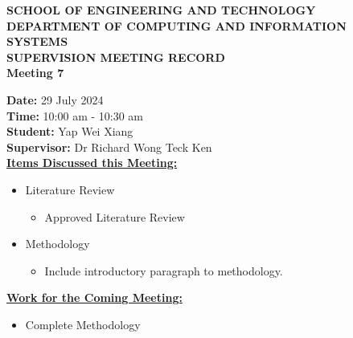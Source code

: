 \documentclass[a4paper, 12pt]{report}
\begin{document}
	
	\onehalfspacing
	
	\begin{center}
		
		\textbf{\large SCHOOL OF ENGINEERING AND TECHNOLOGY}	\\
		\textbf{\small DEPARTMENT OF COMPUTING AND INFORMATION SYSTEMS} \\
		\vspace{1cm}
		\textbf{\LARGE SUPERVISION MEETING RECORD}\\
		\textbf{\normalsize Meeting 7}	%
		
	\end{center}
	
	\noindent			%
	\textbf{Date: } 29 July 2024 \\	%
	\textbf{Time: } 10:00 am - 10:30 am \\	%
	\textbf{Student: } Yap Wei Xiang \\
	\textbf{Supervisor: } Dr Richard Wong Teck Ken \\
	
	\noindent			%
	\textbf{\underline{Items Discussed this Meeting: }}
	\begin{itemize}	%
		\item Literature Review
		\begin{itemize}
			\item Approved Literature Review
		\end{itemize}
		\item Methodology
		\begin{itemize}
			\item Include introductory paragraph to methodology.
		\end{itemize}
	\end{itemize}
	
	\noindent			%
	\textbf{\underline{Work for the Coming Meeting: }}
	\begin{itemize}	%
		\item Complete Methodology
	\end{itemize}
	
	\vfill
	
	
\end{document}
